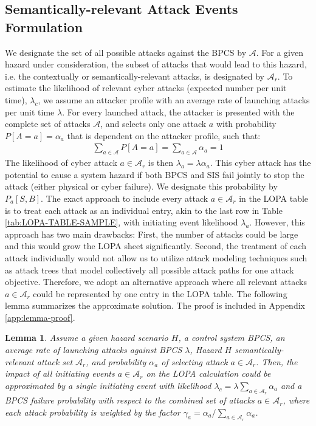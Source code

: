 \documentclass[journal]{IEEEtran}
\newtheorem{lemma}[theorem]{Lemma}
\begin{document}
\subsection{Semantically-relevant Attack Events Formulation} \label{sec:symantec-attack}
We designate the set of all possible attacks against the BPCS by $\mathcal{A}$. For a given hazard under consideration, the subset of attacks that would lead to this hazard, i.e. the contextually or semantically-relevant attacks, is designated by $\mathcal{A}_r$. To estimate the likelihood of relevant cyber attacks (expected number per unit time), $\lambda_c$, we assume an attacker profile with an average rate of launching attacks per unit time $\lambda$. For every launched attack, the attacker is presented with the complete set of attacks $\mathcal{A}$, and selects only one attack $a$ with probability $P[A=a] = \alpha_a$ that is dependent on the attacker profile, such that:
\begin{align}
\sum_{a \in \mathcal{A}}P[A=a] = \sum_{a \in \mathcal{A}}\alpha_a = 1
\end{align}
The likelihood of cyber attack $a \in \mathcal{A}_r$ is then $\lambda_a = \lambda \alpha_a$. This cyber attack has the potential to cause a system hazard if both BPCS and SIS fail jointly to stop the attack (either physical or cyber failure). We designate this probability by $P_a[S,B]$. The exact approach to include every attack $a \in \mathcal{A}_r$ in the LOPA table is to treat each attack as an individual entry, akin to the last row in Table \ref{tab:LOPA-TABLE-SAMPLE}, with initiating event likelihood $\lambda_a$. However, this approach has two main drawbacks: First, the number of attacks could be large and this would grow the LOPA sheet significantly. Second, the treatment of each attack individually would not allow us to utilize attack modeling techniques such as attack trees that model collectively all possible attack paths for one attack objective. Therefore, we adopt an alternative approach where all relevant attacks $a \in \mathcal{A}_r$ could be represented by one entry in the LOPA table. The following lemma summarizes the approximate solution. The proof is included in Appendix \ref{app:lemma-proof}.
\begin{lemma} \label{lemma:ATTACK-AGGREGATION}
Assume a given hazard scenario $H$, a control system BPCS, an average rate of launching attacks against BPCS $\lambda$, Hazard $H$ semantically-relevant attack set $\mathcal{A}_r$, and probability $\alpha_a$ of selecting attack $a \in \mathcal{A}_r$. Then, the impact of all initiating events $a \in \mathcal{A}_r$ on the LOPA calculation could be approximated by a single initiating event with likelihood $\lambda_c = \lambda \sum_{a \in \mathcal{A}_r} \alpha_a$ and a BPCS failure probability with respect to the combined set of attacks $a \in \mathcal{A}_r$, where each attack probability is weighted by the factor $\gamma_a = \alpha_a / \sum_{a \in \mathcal{A}_r} \alpha_a$.
\end{lemma}
\end{document}

